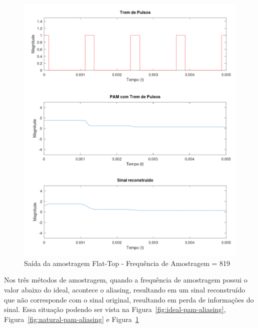 \begin{figure}[H]
    \centering
    \includegraphics[width=0.8\linewidth]{03_results/octave_results/flattop_aliasing_sampling.png}
    \caption{Saída da amostragem Flat-Top - Frequência de Amostragem = 819}
    \label{fig:flattop-pam-aliasing}
\end{figure}

Nos três métodos de amostragem, quando a frequência de amostragem possui o valor abaixo do ideal, acontece o aliasing, resultando em um sinal reconstruído que não corresponde com o sinal original, resultando em perda de informações do sinal. Essa situação podendo ser vista na Figura~\ref{fig:ideal-pam-aliasing}, Figura~\ref{fig:natural-pam-aliasing} e Figura~\ref{fig:flattop-pam-aliasing}


